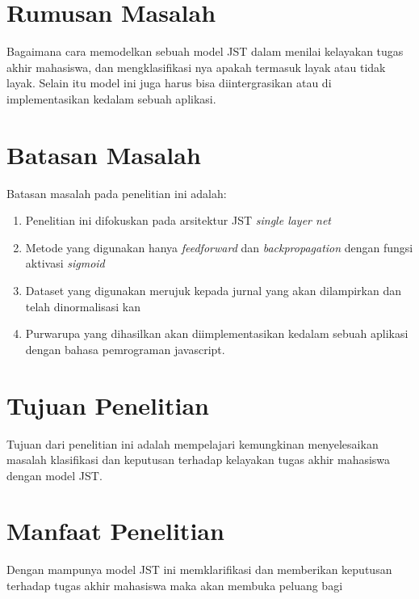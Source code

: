 \section{Rumusan Masalah}
Bagaimana cara memodelkan sebuah model JST dalam menilai kelayakan tugas akhir mahasiswa, dan mengklasifikasi nya apakah termasuk layak atau tidak layak. Selain itu model ini juga harus bisa diintergrasikan atau di implementasikan kedalam sebuah aplikasi. 


\section{Batasan Masalah}
Batasan masalah pada penelitian ini adalah:
\begin{enumerate}
\item Penelitian ini difokuskan pada arsitektur JST \emph{single layer net}
\item Metode yang digunakan hanya \emph{feedforward} dan \emph{backpropagation} dengan fungsi aktivasi \emph{sigmoid}
\item Dataset yang digunakan merujuk kepada jurnal yang akan dilampirkan dan telah dinormalisasi kan\cite{ImplementasiJaringanSyarafTiruanUntukMenilaiKelayakanTugasAkhirMahasiswaStudiKasusDiAmikBukittinggi} 
\item Purwarupa yang dihasilkan akan diimplementasikan kedalam sebuah aplikasi dengan bahasa pemrograman javascript.
\end{enumerate}


\section{Tujuan Penelitian}
Tujuan dari penelitian ini adalah mempelajari kemungkinan menyelesaikan masalah klasifikasi dan keputusan terhadap kelayakan tugas akhir mahasiswa dengan model JST.


\section{Manfaat Penelitian}
Dengan mampunya model JST ini memklarifikasi dan memberikan keputusan terhadap tugas akhir mahasiswa maka akan membuka peluang bagi 



\begin{comment}

\end{comment}
